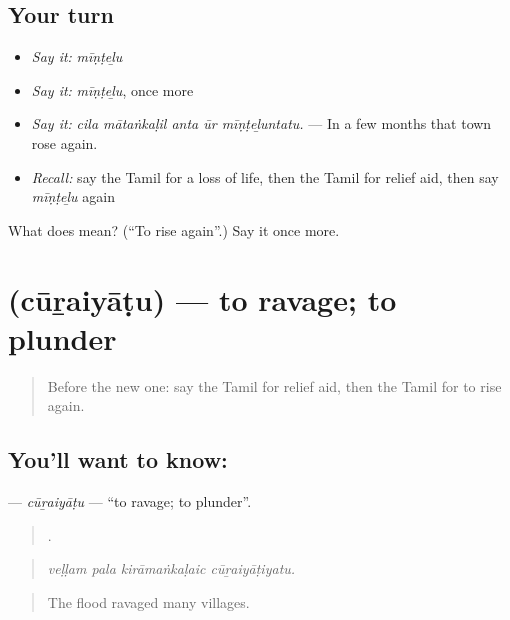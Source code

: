 \subsection*{Your turn}
\begin{itemize}
\raggedright
  \item \emph{Say it:} \emph{mīṇṭeḻu}
  \item \emph{Say it:} \emph{mīṇṭeḻu}, once more
  \item \emph{Say it:} \emph{cila mātaṅkaḷil anta ūr mīṇṭeḻuntatu.} — In a few months that town rose again.
  \item \emph{Recall:} say the Tamil for a loss of life, then the Tamil for relief aid, then say \emph{mīṇṭeḻu} again
\end{itemize}

\begin{tcolorbox}[breakable,colback=teal!4,colframe=teal!35!black,title={Before you move on}]
What does  mean? (\textquotedblleft{}To rise again\textquotedblright{}.) Say it once more.
\end{tcolorbox}
\section[\texorpdfstring{\ta{சூறையாடு} (cūṟaiyāṭu)}{சூறையாடு (cūṟaiyāṭu)}]{ (cūṟaiyāṭu) — to ravage; to plunder}

\label{lesson:TA-C302-curaiyatu}



\begin{quote}
Before the new one: say the Tamil for relief aid, then the Tamil for to rise again.
\end{quote}

\subsection*{You'll want to know: }
\textbf{} — \emph{cūṟaiyāṭu} — \textquotedblleft{}to ravage; to plunder\textquotedblright{}.

\begin{quote}
   .
\end{quote}

\begin{quote}
\emph{veḷḷam pala kirāmaṅkaḷaic cūṟaiyāṭiyatu.}
\end{quote}

\begin{quote}
The flood ravaged many villages.
\end{quote}

